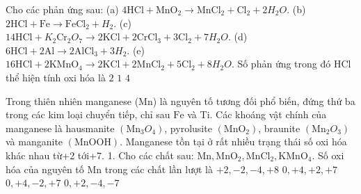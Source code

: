 \begin{ex}[Đề TSĐH A-2008]
	Cho các phản ứng sau:
	(a) $4 \mathrm{HCl}+\mathrm{MnO}_2 \to \mathrm{MnCl}_2+\mathrm{Cl}_2+2 H_2O$.
	(b) $2\mathrm{HCl}+\mathrm{Fe} \to \mathrm{FeCl}_2+H_2$.
	(c) $14 \mathrm{HCl}+K_2\mathrm{Cr}_2O_7 \to 2 \mathrm{KCl}+2 \mathrm{CrCl}_3+3 \mathrm{Cl}_2+7 H_2O$.
	(d) $6\mathrm{HCl}+2\mathrm{Al} \to 2\mathrm{AlCl}_3+3H_2$.
	(e) $16 \mathrm{HCl}+2 \mathrm{KMnO}_4 \to 2 \mathrm{KCl}+2 \mathrm{MnCl}_2+5 \mathrm{Cl}_2+8 H_2O$.
	Số phản ứng trong đó $\mathrm{HCl}$ thể hiện tính oxi hóa là
	\choice
	{$2$}
	{$1$}
	{$4$}
	{}
\end{ex}

\begin{ex}Trong thiên nhiên manganese (Mn) là nguyên tố tương đối phổ biến, đứng thứ ba trong các kim loại chuyển tiếp, chỉ sau $\mathrm{Fe}$ và Ti. Các khoáng vật chính của manganese là hausmanite $\left(\mathrm{Mn}_3O_4\right)$, pyrolusite $\left(\mathrm{MnO}_2\right)$, braunite $\left(\mathrm{Mn}_2O_3\right)$ và manganite $(\mathrm{MnOOH})$. Manganese tồn tại ở rất nhiều trạng thái số oxi hóa khác nhau từ+2 tới+7.
	1. Cho các chất sau: $\mathrm{Mn}, \mathrm{MnO}_2, \mathrm{MnCl}_2, \mathrm{KMnO}_4$. Số oxi hóa của nguyên tố $\mathrm{Mn}$ trong các chất lần lượt là
	\choice
	{$+2,-2,-4,+8$}
	{\True $0,+4,+2,+7$}
	{$0,+4,-2,+7$}
	{$0,+2,-4,-7$}
	\loigiai{}
\end{ex}

